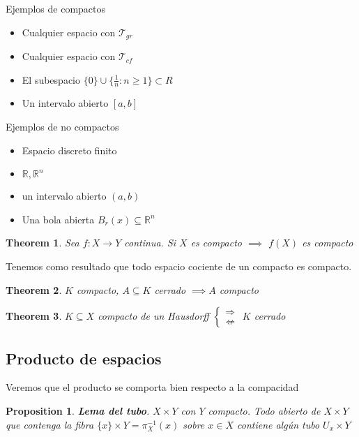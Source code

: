 \documentclass[leqno]{article}
\newtheorem*{theorem}{Theorem}
\newtheorem*{proposition}{Proposition}
\begin{document}
\begin{minipage}{0.5\textwidth}
Ejemplos de compactos
\begin{itemize}[topsep=-6pt, itemsep=0pt]
  \item Cualquier espacio con $\mathcal{T}_{gr}$
  \item Cualquier espacio con $\mathcal{T}_{cf}$ 
  \item El subespacio $\{0\}\cup \{\frac{1}{n}:n\ge 1\}\subset R$
  \item Un intervalo abierto $[a, b]$
\end{itemize}
\end{minipage}
\begin{minipage}{0.5\textwidth}
Ejemplos de no compactos
\begin{itemize}[topsep=-6pt, itemsep=0pt]
  \item Espacio discreto finito
  \item $\mathbb{R}, \mathbb{R}^n$
  \item un intervalo abierto $(a, b)$
  \item Una bola abierta  $B_{r}(x)\subseteq \mathbb{R}^n$
\end{itemize}
\end{minipage}

\begin{theorem}
Sea $f:X\to Y$ continua. Si $X$ es compacto  $\implies$ $f(X)$ es compacto
\end{theorem}
Tenemos como resultado que todo espacio cociente de un compacto es compacto.

\begin{theorem}
$K$ compacto, $A\subseteq K$ cerrado $\implies A$ compacto
\end{theorem}

\begin{theorem}
$K\subseteq X$ compacto de un Hausdorff $\begin{cases}
  \Rightarrow \\
  \not\Leftarrow
\end{cases}$ 
$K$ cerrado
\end{theorem}

\subsection{Producto de espacios}
Veremos que el producto se comporta bien respecto a la compacidad

\begin{proposition}
\textbf{Lema del tubo}. $X\times Y$ con $Y$ compacto. Todo abierto de $X\times Y$ que contenga la fibra $\{x\}\times Y = \pi_X^{-1}(x)$ sobre $x\in X$ contiene algún tubo $U_x\times Y$
\end{proposition}
\end{document}
